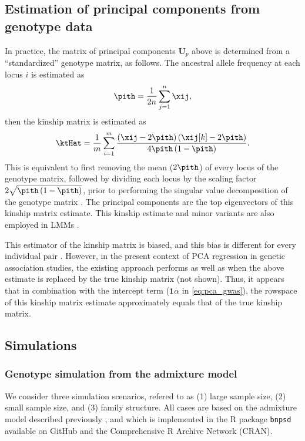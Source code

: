 \documentclass[12pt]{article}
\begin{document}
\subsection{Estimation of principal components from genotype data}

In practice, the matrix of principal components $\mathbf{U}_p$ above is determined from a ``standardized'' genotype matrix, as follows.
The ancestral allele frequency at each locus $i$ is estimated as
$$
\pith = \frac{1}{2n} \sum_{j = 1}^n \xij,
$$
then the kinship matrix is estimated as
$$
\ktHat
=
\frac{1}{m} \sum_{i = 1}^m
\frac{
  \left( \xij - 2 \pith \right) \left( \xij[k] - 2 \pith \right)
}{
  4 \pith \left( 1 - \pith \right)
}
.
$$
This is equivalent to first removing the mean ($2 \pith$) of every locus of the genotype matrix, followed by dividing each locus by the scaling factor $2 \sqrt{\pith \left( 1 - \pith \right)}$, prior to performing the singular value decomposition of the genotype matrix \citep{patterson_population_2006}.
The principal components are the top eigenvectors of this kinship matrix estimate.
This kinship estimate and minor variants are also employed in LMMs \citep{yang_gcta:_2011}.

This estimator of the kinship matrix is biased, and this bias is different for every individual pair \citep{ochoa_fst2, ochoa_human}.
However, in the present context of PCA regression in genetic association studies, the existing approach performs as well as when the above estimate is replaced by the true kinship matrix (not shown).
Thus, it appears that in combination with the intercept term ($\mathbf{1} \alpha$ in \cref{eq:pca_gwas}), the rowspace of this kinship matrix estimate approximately equals that of the true kinship matrix.

\subsection{Simulations}

\subsubsection{Genotype simulation from the admixture model}

We consider three simulation scenarios, refered to as (1) large sample size, (2) small sample size, and (3) family structure.
All cases are based on the admixture model described previously \citep{ochoa_fst1, ochoa_fst2}, and which is implemented in the R package \texttt{bnpsd} available on GitHub and the Comprehensive R Archive Network (CRAN).
\end{document}
